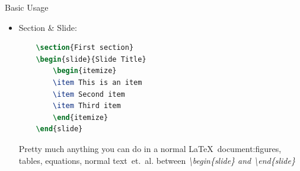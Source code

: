\documentclass[
 size=14pt,
 paper=smartboard,  %
 mode=present, 		%
 display=slides, 	%
 style=tuliplab,  	%
 pauseslide,
 fleqn,leqno]{powerdot}
\begin{document}
\begin{slide}[toc=,bm=,method=direct]{Basic Usage}
\begin{itemize}
  \item Section \& Slide:
  \begin{lstlisting}[language=TeX]
    % section: title takes up full slide
    \section{First section}
    \begin{slide}{Slide Title}
        \begin{itemize}
        \item This is an item
        \item Second item
        \item Third item
        \end{itemize}
    \end{slide}
  \end{lstlisting}
  Pretty much anything you can do in a normal \LaTeX\
      document:figures,
      tables,
      equations,
      normal text~{et.~al.}
      between \textit{\textbackslash begin\{slide\}
      and \textbackslash end\{slide\}}
  \end{itemize}
  \end{slide}
\end{document}
